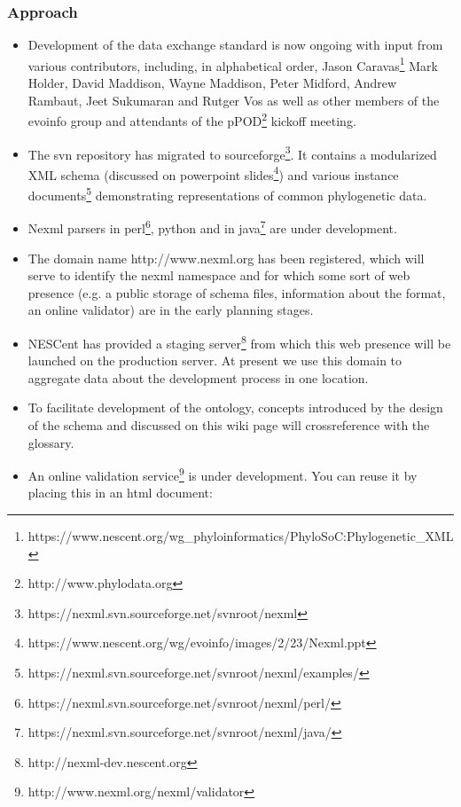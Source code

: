 \documentclass{article}
\begin{document}
\subsubsection{Approach}

\begin{itemize}

\item Development of the data exchange standard is now ongoing with input from various contributors, including, in alphabetical order, Jason Caravas\footnote{https://www.nescent.org/wg\_phyloinformatics/PhyloSoC:Phylogenetic\_XML} Mark  Holder, David Maddison, Wayne Maddison, Peter Midford, Andrew Rambaut, Jeet Sukumaran and Rutger Vos as well as other members of the evoinfo group and attendants of the pPOD\footnote{http://www.phylodata.org} kickoff meeting.

\item The svn repository has migrated to sourceforge\footnote{https://nexml.svn.sourceforge.net/svnroot/nexml}. It contains a modularized XML schema (discussed on powerpoint slides\footnote{https://www.nescent.org/wg/evoinfo/images/2/23/Nexml.ppt}) and various instance documents\footnote{https://nexml.svn.sourceforge.net/svnroot/nexml/examples/} demonstrating representations of common phylogenetic data.
	
\item Nexml parsers in perl\footnote{https://nexml.svn.sourceforge.net/svnroot/nexml/perl/}, python and in java\footnote{https://nexml.svn.sourceforge.net/svnroot/nexml/java/} are under development.

\item The domain name http://www.nexml.org has been registered, which will serve to identify the nexml namespace and for which some sort of web presence (e.g. a public storage of schema files, information about the format, an online validator) are in the early planning stages.	

\item NESCent has provided a staging server\footnote{http://nexml-dev.nescent.org} from which this web presence will be launched on the production server. At present we use this domain to aggregate data about the development process in one location.	

\item To facilitate development of the ontology, concepts introduced by the design of the schema and discussed on this wiki page will crossreference with the glossary.	

\item An online validation service\footnote{http://www.nexml.org/nexml/validator} is under development. You can reuse it by placing this in an html document: 


\end{itemize}
\end{document}
